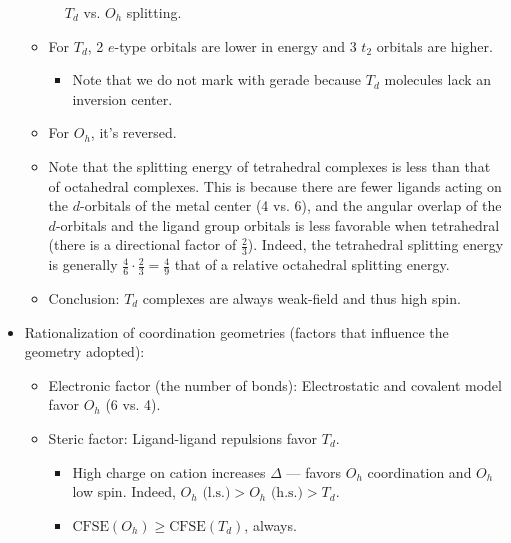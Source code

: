 \documentclass[../notes.tex]{subfiles}
\begin{document}
\begin{itemize}
\begin{figure}[H]
        \caption{$T_d$ vs. $O_h$ splitting.}
        \label{fig:TdOhSplitting}
    \end{figure}
    \begin{itemize}
        \item For $T_d$, 2 $e$-type orbitals are lower in energy and 3 $t_2$ orbitals are higher.
        \begin{itemize}
            \item Note that we do not mark with gerade because $T_d$ molecules lack an inversion center.
        \end{itemize}
        \item For $O_h$, it's reversed.
        \item Note that the splitting energy of tetrahedral complexes is less than that of octahedral complexes. This is because there are fewer ligands acting on the $d$-orbitals of the metal center (4 vs. 6), and the angular overlap of the $d$-orbitals and the ligand group orbitals is less favorable when tetrahedral (there is a directional factor of $\frac{2}{3}$). Indeed, the tetrahedral splitting energy is generally $\frac{4}{6}\cdot\frac{2}{3}=\frac{4}{9}$ that of a relative octahedral splitting energy.
        \item Conclusion: $T_d$ complexes are always weak-field and thus high spin.
    \end{itemize}
    \item Rationalization of coordination geometries (factors that influence the geometry adopted):
    \begin{itemize}
        \item Electronic factor (the number of bonds): Electrostatic and covalent model favor $O_h$ (6 vs. 4).
        \item Steric factor: Ligand-ligand repulsions favor $T_d$.
        \begin{itemize}
            \item High charge on cation increases $\Delta$ --- favors $O_h$ coordination and $O_h$ low spin. Indeed, $O_h\text{ (l.s.)}>O_h\text{ (h.s.)}>T_d$.
            \item $\text{CFSE}(O_h)\geq\text{CFSE}(T_d)$, always.
        \end{itemize}

\end{itemize}
\end{itemize}
\end{document}

